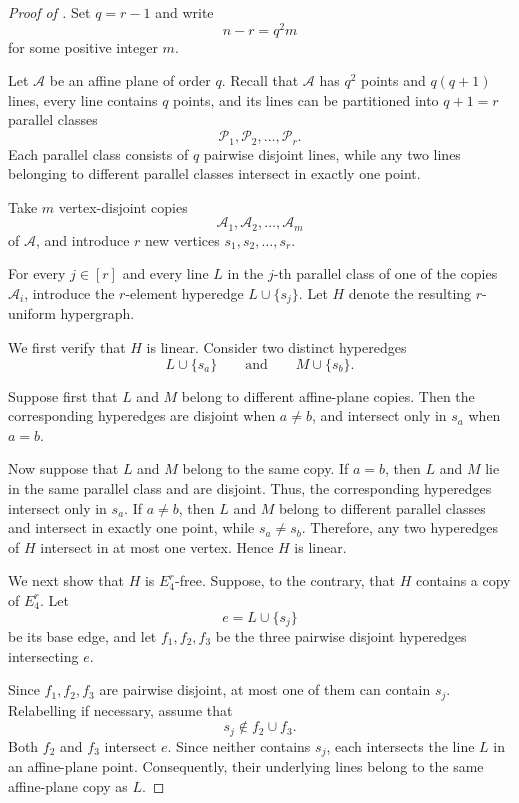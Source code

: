 \documentclass[11pt,a4paper]{article}
\theoremstyle{definition}
\theoremstyle{remark}
\begin{document}
\begin{proof}[Proof of ]
Set
$
q=r-1
$
and write
$$
n-r=q^2m
$$
for some positive integer \(m\).

Let \(\mathcal{A}\) be an affine plane of order \(q\). Recall that
\(\mathcal{A}\) has \(q^2\) points and \(q(q+1)\) lines, every line
contains \(q\) points, and its lines can be partitioned into
\(q+1=r\) parallel classes
$$
\mathcal{P}_1,\mathcal{P}_2,\ldots,\mathcal{P}_r.
$$
Each parallel class consists of \(q\) pairwise disjoint lines, while
any two lines belonging to different parallel classes intersect in
exactly one point.

Take \(m\) vertex-disjoint copies
$$
\mathcal{A}_1,\mathcal{A}_2,\ldots,\mathcal{A}_m
$$
of \(\mathcal{A}\), and introduce \(r\) new vertices
$
s_1,s_2,\ldots,s_r.
$

For every \(j\in[r]\) and every line \(L\) in the \(j\)-th parallel
class of one of the copies \(\mathcal{A}_i\), introduce the
\(r\)-element hyperedge
$
L\cup\{s_j\}.
$
Let \(H\) denote the resulting \(r\)-uniform hypergraph.

We first verify that \(H\) is linear. Consider two distinct hyperedges
$$
L\cup\{s_a\}
\qquad\text{and}\qquad
M\cup\{s_b\}.
$$

Suppose first that \(L\) and \(M\) belong to different affine-plane
copies. Then the corresponding hyperedges are disjoint when
\(a\neq b\), and intersect only in \(s_a\) when \(a=b\).

Now suppose that \(L\) and \(M\) belong to the same copy. If \(a=b\),
then \(L\) and \(M\) lie in the same parallel class and are disjoint.
Thus, the corresponding hyperedges intersect only in \(s_a\). If
\(a\neq b\), then \(L\) and \(M\) belong to different parallel
classes and intersect in exactly one point, while \(s_a\neq s_b\).
Therefore, any two hyperedges of \(H\) intersect in at most one vertex.
Hence \(H\) is linear.

We next show that \(H\) is \(E_4^r\)-free. Suppose, to the contrary,
that \(H\) contains a copy of \(E_4^r\). Let
$$
e=L\cup\{s_j\}
$$
be its base edge, and let \(f_1,f_2,f_3\) be the three pairwise
disjoint hyperedges intersecting \(e\).

Since \(f_1,f_2,f_3\) are pairwise disjoint, at most one of them can
contain \(s_j\). Relabelling if necessary, assume that
$$
s_j\notin f_2\cup f_3.
$$
Both \(f_2\) and \(f_3\) intersect \(e\). Since neither contains
\(s_j\), each intersects the line \(L\) in an affine-plane point.
Consequently, their underlying lines belong to the same affine-plane
copy as \(L\).


\end{proof}
\end{document}
